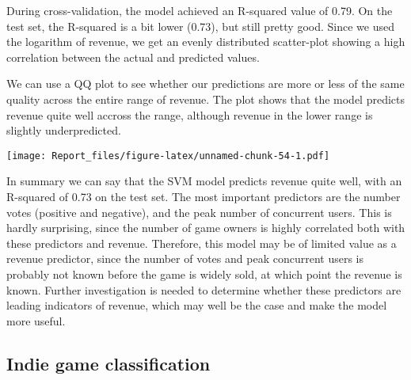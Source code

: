 \documentclass[
]{article}
\newenvironment{Shaded}{\begin{snugshade}}{\end{snugshade}}
\newcommand{\AttributeTok}[1]{\textcolor[rgb]{0.13,0.29,0.53}{#1}}
\newcommand{\CommentTok}[1]{\textcolor[rgb]{0.56,0.35,0.01}{\textit{#1}}}
\newcommand{\DecValTok}[1]{\textcolor[rgb]{0.00,0.00,0.81}{#1}}
\newcommand{\FunctionTok}[1]{\textcolor[rgb]{0.13,0.29,0.53}{\textbf{#1}}}
\newcommand{\NormalTok}[1]{#1}
\newcommand{\SpecialCharTok}[1]{\textcolor[rgb]{0.81,0.36,0.00}{\textbf{#1}}}
\newcommand{\StringTok}[1]{\textcolor[rgb]{0.31,0.60,0.02}{#1}}
\begin{document}
During cross-validation, the model achieved an R-squared value of 0.79.
On the test set, the R-squared is a bit lower (0.73), but still pretty
good. Since we used the logarithm of revenue, we get an evenly
distributed scatter-plot showing a high correlation between the actual
and predicted values.

We can use a QQ plot to see whether our predictions are more or less of
the same quality across the entire range of revenue. The plot shows that
the model predicts revenue quite well accross the range, although
revenue in the lower range is slightly underpredicted.

\begin{Shaded}
\end{Shaded}

\texttt{[image: Report\_files/figure-latex/unnamed-chunk-54-1.pdf]}

In summary we can say that the SVM model predicts revenue quite well,
with an R-squared of 0.73 on the test set. The most important predictors
are the number votes (positive and negative), and the peak number of
concurrent users. This is hardly surprising, since the number of game
owners is highly correlated both with these predictors and revenue.
Therefore, this model may be of limited value as a revenue predictor,
since the number of votes and peak concurrent users is probably not
known before the game is widely sold, at which point the revenue is
known. Further investigation is needed to determine whether these
predictors are leading indicators of revenue, which may well be the case
and make the model more useful.

\hypertarget{indie-game-classification}{%
\subsection{Indie game classification}\label{indie-game-classification}}
\end{document}
